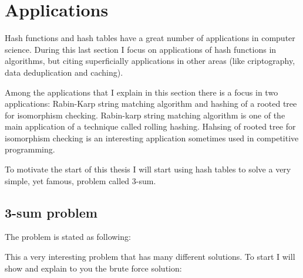 \chapter{Applications}
\label{cap:Applications}


Hash functions and hash tables have a great number of applications in computer science. During this last section I focus on applications of hash functions in algorithms, but citing superficially applications in other areas (like criptography, data deduplication and caching).

Among the applications that I explain in this section there is a focus in two applications: Rabin-Karp string matching algorithm and hashing of a rooted tree for isomorphism checking. Rabin-karp string matching algorithm is one of the main application of a technique called rolling hashing. Hahsing of rooted tree for isomorphism checking is an interesting application sometimes used in competitive programming.

To motivate the start of this thesis I will start using hash tables to solve a very simple, yet famous, problem called 3-sum.
\section{3-sum problem}
The problem is stated as following:

\medskip


\medskip

This a very interesting problem that has many different solutions. To start I will show and explain to you the brute force solution:

